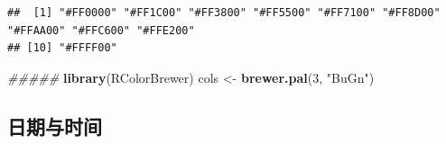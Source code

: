 \documentclass[]{book}
\newenvironment{Shaded}{\begin{snugshade}}{\end{snugshade}}
\newcommand{\CommentTok}[1]{\textcolor[rgb]{0.56,0.35,0.01}{\textit{#1}}}
\newcommand{\DecValTok}[1]{\textcolor[rgb]{0.00,0.00,0.81}{#1}}
\newcommand{\KeywordTok}[1]{\textcolor[rgb]{0.13,0.29,0.53}{\textbf{#1}}}
\newcommand{\NormalTok}[1]{#1}
\newcommand{\StringTok}[1]{\textcolor[rgb]{0.31,0.60,0.02}{#1}}
\begin{document}
\begin{verbatim}
##  [1] "#FF0000" "#FF1C00" "#FF3800" "#FF5500" "#FF7100" "#FF8D00" "#FFAA00" "#FFC600" "#FFE200"
## [10] "#FFFF00"
\end{verbatim}

\begin{Shaded}
\begin{Highlighting}[]
\CommentTok{#####}
\KeywordTok{library}\NormalTok{(RColorBrewer)}
\NormalTok{cols <-}\StringTok{ }\KeywordTok{brewer.pal}\NormalTok{(}\DecValTok{3}\NormalTok{, }\StringTok{"BuGn"}\NormalTok{)}
\end{Highlighting}
\end{Shaded}

\hypertarget{ux65e5ux671fux4e0eux65f6ux95f4}{%
\subsection{日期与时间}\label{ux65e5ux671fux4e0eux65f6ux95f4}}
\end{document}

